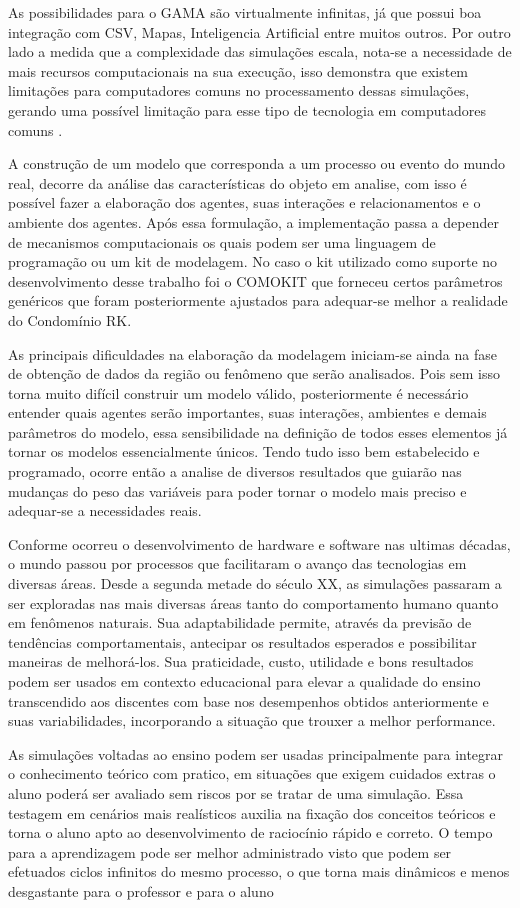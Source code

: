 As possibilidades para o GAMA são virtualmente infinitas, já que possui boa integração com CSV, Mapas, Inteligencia Artificial entre muitos outros. Por outro lado a medida que a complexidade das simulações escala, nota-se a necessidade de mais recursos computacionais na sua execução, isso demonstra que existem limitações para computadores comuns no processamento dessas simulações, gerando uma possível limitação para esse tipo de tecnologia em computadores comuns\cite{gamaplataform} .

A construção de um modelo que corresponda a um processo ou evento do mundo real, decorre da análise das características do objeto em analise, com isso é possível fazer a elaboração dos agentes, suas interações e relacionamentos e o ambiente dos agentes. Após essa formulação, a implementação passa a depender de mecanismos computacionais os quais podem ser uma linguagem de programação ou um kit de modelagem\cite{macaltutorial:online}. No caso o kit utilizado como suporte no desenvolvimento desse trabalho foi o COMOKIT que forneceu certos parâmetros genéricos que foram posteriormente ajustados para adequar-se melhor a realidade do Condomínio RK.

As principais dificuldades na elaboração da modelagem iniciam-se ainda na fase de obtenção de dados da região ou fenômeno que serão analisados. Pois sem isso torna muito difícil construir um modelo válido, posteriormente é necessário entender quais agentes serão importantes, suas interações, ambientes e demais parâmetros do modelo, essa sensibilidade na definição de todos esses elementos já tornar os modelos essencialmente únicos. Tendo tudo isso bem estabelecido e programado, ocorre então a analise de diversos resultados que guiarão nas mudanças do peso das variáveis para poder tornar o modelo mais preciso e adequar-se a necessidades reais.

Conforme ocorreu o desenvolvimento de hardware e software nas ultimas décadas, o mundo passou por processos que facilitaram o avanço das tecnologias em diversas áreas. Desde a segunda metade do século XX, as simulações passaram a ser exploradas nas mais diversas áreas tanto do comportamento humano quanto em fenômenos naturais. Sua adaptabilidade permite, através da previsão de tendências comportamentais, antecipar os resultados esperados e possibilitar maneiras de melhorá-los. Sua praticidade, custo, utilidade e bons resultados podem ser usados em contexto educacional para elevar a qualidade do ensino transcendido aos discentes com base nos desempenhos obtidos anteriormente e suas variabilidades, incorporando a situação que trouxer a melhor performance.

As simulações voltadas ao ensino podem ser usadas principalmente para integrar o conhecimento teórico com pratico, em situações que exigem cuidados extras o aluno poderá ser avaliado sem riscos por se tratar de uma simulação. Essa testagem em cenários mais realísticos auxilia na fixação dos conceitos teóricos e torna o aluno apto ao desenvolvimento de raciocínio rápido e correto. O tempo para a aprendizagem pode ser melhor administrado visto que podem ser efetuados ciclos infinitos do mesmo processo, o que torna mais dinâmicos e menos desgastante para o professor e para o aluno


